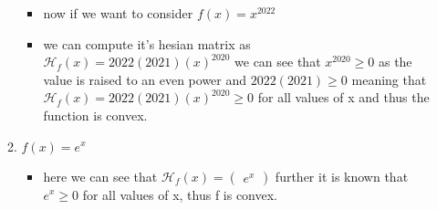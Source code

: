 \documentclass[12pt,twoside]{article}
\begin{document}
\begin{enumerate}[label=9.1]
\begin{enumerate}
        \begin{itemize}
        \item now if we want to consider $f(x)=x^{2022}$
        \item we can compute it's hesian matrix as $\mathcal{H}_{f}(x)=2022(2021)(x)^{2020}$ we can see that $x^{2020}\geq $0 as the value is raised to an even power and $2022(2021)\geq 0$ meaning that $\mathcal{H}_{f}(x)=2022(2021)(x)^{2020}\geq 0$ for all values of x and thus the function is convex.  
    \end{itemize}
    \item $f(x)=e^x$
        \begin{itemize}
        \item here we can see that $\mathcal{H}_f(x)=\begin{pmatrix}e^x \end{pmatrix}$ further it is known that $e^x\geq0$ for all values of x, thus f is convex.
    \end{itemize}
    
\end{enumerate}
\newpage
\end{enumerate}
\end{document}
